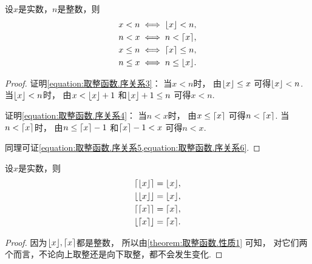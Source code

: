 \begin{property}
设\(x\)是实数，\(n\)是整数，则\begin{gather}
	x < n \iff \lfloor x\rfloor < n,
	\label{equation:取整函数.序关系3} \\
	n < x \iff n < \lceil x\rceil,
	\label{equation:取整函数.序关系4} \\
	x \leq n \iff \lceil x\rceil \leq n,
	\label{equation:取整函数.序关系5} \\
	n \leq x \iff n \leq \lfloor x\rfloor.
	\label{equation:取整函数.序关系6}
\end{gather}
\begin{proof}
证明\cref{equation:取整函数.序关系3}：
当\(x < n\)时，
由\(\lfloor x\rfloor \leq x\)
可得\(\lfloor x\rfloor < n\).
当\(\lfloor x\rfloor < n\)时，
由\(x < \lfloor x\rfloor + 1\)
和\(\lfloor x\rfloor + 1 \leq n\)
可得\(x < n\).

证明\cref{equation:取整函数.序关系4}：
当\(n < x\)时，
由\(x \leq \lceil x\rceil\)
可得\(n < \lceil x\rceil\).
当\(n < \lceil x\rceil\)时，
由\(n \leq \lceil x\rceil - 1\)
和\(\lceil x\rceil - 1 < x\)
可得\(n < x\).

同理可证\cref{equation:取整函数.序关系5,equation:取整函数.序关系6}.
\end{proof}
\end{property}

\begin{proposition}
设\(x\)是实数，则\begin{gather*}
	\lceil\lfloor x\rfloor\rceil = \lfloor x\rfloor, \\
	\lfloor\lfloor x\rfloor\rfloor = \lfloor x\rfloor, \\
	\lceil\lceil x\rceil\rceil = \lceil x\rceil, \\
	\lfloor\lceil x\rceil\rfloor = \lceil x\rceil.
\end{gather*}
\begin{proof}
因为\(\lfloor x\rfloor,\lceil x\rceil\)都是整数，
所以由\cref{theorem:取整函数.性质1} 可知，
对它们两个而言，不论向上取整还是向下取整，都不会发生变化.
\end{proof}
\end{proposition}


